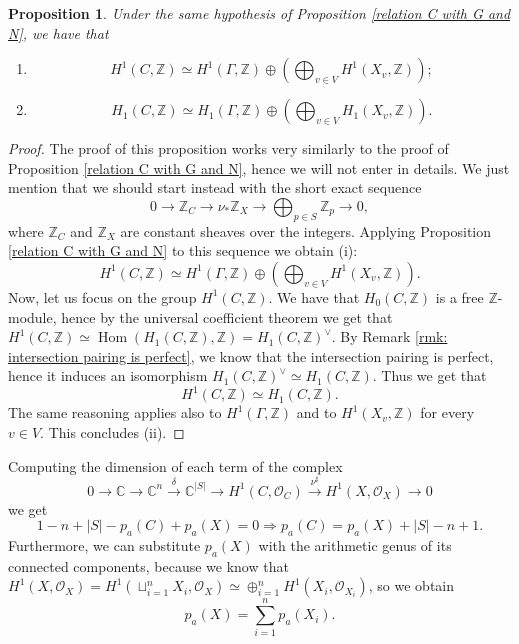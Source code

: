 \documentclass[a4paper,12 pt,titlepage,twoside]{book}
\newcommand{\numberset}{\mathbb}
\newcommand{\Z}{\numberset{Z}}
\newcommand{\C}{\numberset{C}}
\newcommand{\os}{\mathcal{O}}
\DeclareMathOperator{\Hom}{Hom}
\theoremstyle{plain}
\theoremstyle{theorem}
\newtheorem{prop}[thm]{Proposition}
\theoremstyle{definition}
\theoremstyle{remark}
\newtheorem{oss}[thm]{Remark}
\begin{document}
	\begin{prop}\label{relation C with G and N but in Z}
		Under the same hypothesis of Proposition \ref{relation C with G and N}, we have that \begin{enumerate}[label=(\roman*)]
			\item $$H^1(C,\Z) \simeq H^1(\Gamma,\Z) \oplus \left(\bigoplus_{v \in V} H^1(X_v, \Z)\right);$$
			\item $$H_1(C, \Z) \simeq H_1(\Gamma,\Z) \oplus \left(\bigoplus_{v \in V} H_1(X_v, \Z)\right).$$
		\end{enumerate} 
	\end{prop}
	\begin{proof}
		The proof of this proposition works very similarly to the proof of Proposition \ref{relation C with G and N}, hence we will not enter in details. We just mention that we should start instead with the short exact sequence $$0 \rightarrow \Z_C \rightarrow \nu_* \Z_X \rightarrow \bigoplus_{p \in S} \Z_p \rightarrow 0,$$ where $\Z_C$ and $\Z_X$ are constant sheaves over the integers. Applying Proposition \ref{relation C with G and N} to this sequence we obtain (i): $$ H^1(C,\Z) \simeq H^1(\Gamma,\Z) \oplus \left(\bigoplus_{v \in V} H^1(X_v, \Z)\right).$$ 
		Now, let us focus on the group $H^1(C,\Z).$ We have that $H_0(C,\Z)$ is a free $\Z$-module, hence by the universal coefficient theorem we get that $H^1(C,\Z) \simeq \Hom(H_1(C,\Z), \Z) = H_1(C,\Z)^\vee.$ By Remark \ref{rmk: intersection pairing is perfect}, we know that the intersection pairing is perfect, hence it induces an isomorphism $H_1(C,\Z)^\vee \simeq H_1(C,\Z)$. Thus we get that $$H^1(C,\Z) \simeq H_1(C,\Z).$$ The same reasoning applies also to $H^1(\Gamma,\Z)$ and to $H^1(X_v,\Z)$ for every $v \in V.$ This concludes (ii).
	\end{proof}
	Computing the dimension of each term of the complex $$0 \rightarrow \C \rightarrow \C^n \stackrel{\delta}{\longrightarrow} \C^{|S|} \rightarrow H^1(C,\os_C) \stackrel{\nu^\sharp}{\longrightarrow} H^1(X,\os_X) \rightarrow 0$$ we get $$1 -n + |S| - p_a(C) + p_a(X) = 0 \Rightarrow p_a(C) = p_a(X) + |S| - n +1.$$ Furthermore, we can substitute $p_a(X)$ with the arithmetic genus of its connected components, because we know that $H^1(X,\os_X) = H^1(\sqcup_{i=1}^n X_i,\os_X) \simeq \oplus_{i=1}^n H^1(X_i,\os_{X_i})$, so we obtain $$p_a(X) = \sum_{i=1}^{n} p_a(X_i).$$ 
\end{document}
